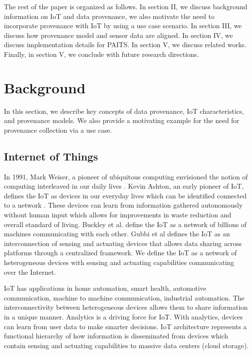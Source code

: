 \documentclass[conference]{IEEEtran}
\begin{document}
\par The rest of the paper is organized as follows. In section II, we discuss background information on IoT and data provenance, we also motivate the need to incorporate provenance with IoT  by using a use case scenario. In section III, we discuss how provenance model and sensor data are aligned. In section IV, we discuss implementation details for PAITS. In section V, we discuss related works. Finally, in section V, we conclude with future research directions.


\section{Background} 
In this section, we  describe key concepts of data provenance, IoT characteristics, and provenance models. We also provide a motivating example for the need for provenance collection via a use case.

\subsection{Internet of Things}

In 1991, Mark Weiser, a pioneer of ubiquitous computing envisioned the notion of computing interleaved in our daily lives \cite{weiser1991}. Kevin Ashton, an early pioneer of IoT, defines the IoT as devices in our everyday lives which can be identified connected to a network \cite{ashton2009internet}. These devices can learn from information gathered autonomously without human input which allows for improvements in waste reduction and overall standard of living. Buckley et al. \cite{yan2008internet} define the IoT as a network of billions of machines communicating with each other. Gubbi et al \cite{gubbi_internet_2013} defines the IoT as an interconnection of sensing and actuating
devices that allows data sharing across platforms through a centralized framework. We
define the IoT as a network of heterogeneous devices with sensing and actuating capabilities communicating over the Internet.

%
%
%


\par IoT has applications in home automation, smart health, automotive communication, machine to machine communication, industrial automation. The interconnectivity between heterogeneous devices allows them to share information in a unique manner.
Analytics is a driving force for IoT. With analytics, devices can learn from user data
to make smarter decisions. IoT architecture represents a functional hierarchy of how information is disseminated from devices which contain sensing and
actuating capabilities to massive data centers (cloud storage). 
\end{document}
